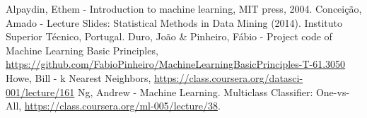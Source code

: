 \documentclass[twoside]{article}
\begin{document}
\begin{multicols}{2}
%
%


{}
\begin{thebibliography}{}	
  Alpaydin, Ethem -   
  Introduction to machine learning, 
  MIT press,
  2004.
  Concei\c{c}\~{a}o, Amado -
  Lecture Slides: Statistical Methods in Data Mining (2014). Instituto Superior Técnico, Portugal.
  Duro, Jo\~{a}o \& Pinheiro, F\'{a}bio - Project code of Machine Learning Basic Principles,
  \url{https://github.com/FabioPinheiro/MachineLearningBasicPrinciples-T-61.3050}
  Howe, Bill - k Nearest Neighbors,
  \url{https://class.coursera.org/datasci-001/lecture/161}
  Ng, Andrew - 
  Machine Learning. Multiclass Classifier: One-vs-All,
  \url{https://class.coursera.org/ml-005/lecture/38}.

\end{thebibliography}
\end{multicols}
\newpage
\end{document}
